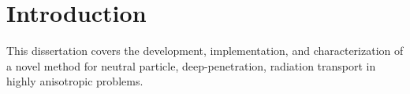 \chapter{Introduction}
\label{ch:introduction}

This dissertation covers the development, implementation, and characterization
of a novel method for neutral particle, deep-penetration, radiation transport in
highly anisotropic problems.








